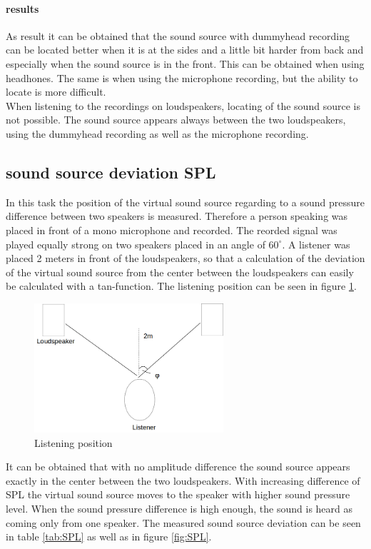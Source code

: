 \documentclass{article}
\begin{document}
\paragraph{results\\}
As result it can be obtained that the sound source with dummyhead recording can be located better when it is at the sides and a little bit harder from back and especially when the sound source is in the front. This can be obtained when using headhones. The same is when using the microphone recording, but the ability to locate is more difficult.\\
When listening to the recordings on loudspeakers, locating of the sound source is not possible. The sound source appears always between the two loudspeakers, using the dummyhead recording as well as the microphone recording.
\subsection{sound source deviation SPL}
In this task the position of the virtual sound source regarding to a sound pressure difference between two speakers is measured. Therefore a person speaking was placed in front of a mono microphone and recorded. The reorded signal was played equally strong on two speakers placed in an angle of $60^\circ$. A listener was placed 2 meters in front of the loudspeakers, so that a calculation of the deviation of the virtual sound source from the center between the loudspeakers can easily be calculated with a tan-function. The listening position can be seen in figure \ref{fig:listening}.
\begin{figure}[htbp]
\begin{center}
\includegraphics[width=7cm,keepaspectratio=true]{listening}
\caption{Listening position}
\label{fig:listening}
\end{center}
\end{figure}
It can be obtained that with no amplitude difference the sound source appears exactly in the center between the two loudspeakers. With increasing difference of SPL the virtual sound source moves to the speaker with higher sound pressure level. When the sound pressure difference is high enough, the sound is heard as coming only from one speaker. The measured sound source deviation can be seen in table \ref{tab:SPL} as well as in figure \ref{fig:SPL}.
\end{document}

